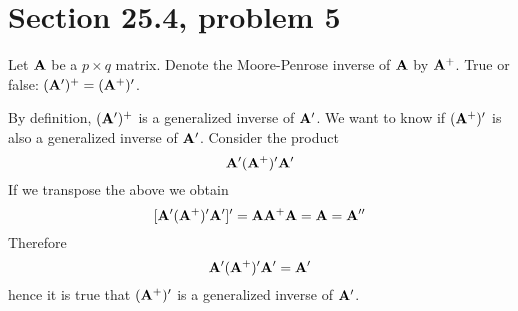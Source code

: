 \section{Section 25.4, problem 5}
Let $\bf A$ be a $p\times q$ matrix.
Denote the Moore-Penrose inverse of $\bf A$ by ${\bf A}^+$.
True or false: $({\bf A}')^+=({\bf A}^+)'$.

\bigskip
\noindent
By definition, $({\bf A}')^+$
is a generalized inverse of ${\bf A}'$.
We want to know if $({\bf A}^+)'$ is also a generalized inverse
of ${\bf A}'$.
Consider the product
$${\bf A}'({\bf A}^+)'{\bf A}'$$
If we transpose the above we obtain
$$[{\bf A}'({\bf A}^+)'{\bf A}']'={\bf A}{\bf A}^+{\bf A}={\bf A}=
{\bf A}''$$
Therefore
$${\bf A}'({\bf A}^+)'{\bf A}'={\bf A}'$$
hence it is true that $({\bf A}^+)'$ is a generalized inverse of
${\bf A}'$.
